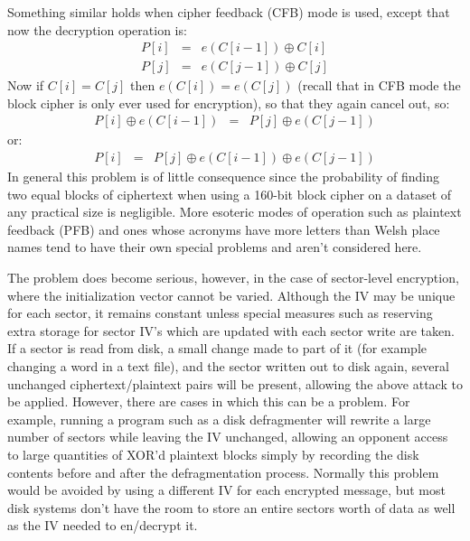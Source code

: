 Something similar holds when cipher feedback (CFB) mode is used, except that
now the decryption operation is:
\begin{eqnarray*}
    P[ i ] & = & e( C[ i-1 ] ) \oplus C[ i ]\\
    P[ j ] & = & e( C[ j-1 ] ) \oplus C[ j ]
\end{eqnarray*}
Now if $C[ i ] = C[ j ]$ then $e( C[ i ] ) = e( C[ j ] )$ (recall that in CFB mode
the block cipher is only ever used for encryption), so that they again cancel
out, so:
\begin{eqnarray*}
    P[ i ] \oplus e( C[ i-1 ] ) & = & P[ j ] \oplus e( C[ j-1 ] )
\end{eqnarray*}
or:
\begin{eqnarray*}
   P[ i ] & = & P[ j ] \oplus e( C[ i-1 ] ) \oplus e( C[ j-1 ] )
\end{eqnarray*}
In general this problem is of little consequence since the probability of
finding two equal blocks of ciphertext when using a 160-bit block cipher on a
dataset of any practical size is negligible.  More esoteric modes of operation
such as plaintext feedback (PFB) and ones whose acronyms have more letters than
Welsh place names tend to have their own special problems and aren't considered
here.  

The problem does become serious, however, in the case of sector-level
encryption, where the initialization vector cannot be varied.  Although the IV
may be unique for each sector, it remains constant unless special measures such
as reserving extra storage for sector IV's which are updated with each sector
write are taken.  If a sector is read from disk, a small change made to part of
it (for example changing a word in a text file), and the sector written out to
disk again, several unchanged ciphertext/plaintext pairs will be present,
allowing the above attack to be applied.  However, there are cases in which
this can be a problem.  For example, running a program such as a disk
defragmenter will rewrite a large number of sectors while leaving the IV
unchanged, allowing an opponent access to large quantities of XOR'd plaintext
blocks simply by recording the disk contents before and after the
defragmentation process.  Normally this problem would be avoided by using a
different IV for each encrypted message, but most disk systems don't have the
room to store an entire sectors worth of data as well as the IV needed to
en/decrypt it.

